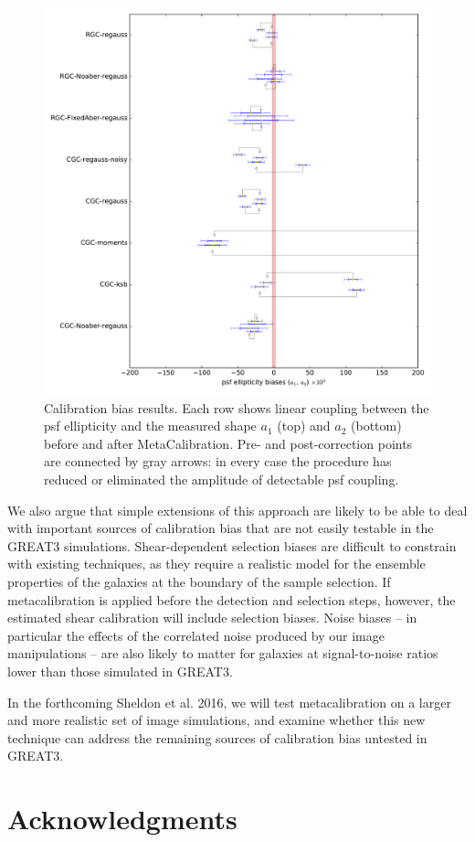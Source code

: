 \documentclass[iop]{emulateapj}
\begin{document}
\begin{figure}[t]
\begin{center}
\includegraphics[width=0.8\linewidth]{./Plots/a_results_linear.pdf}
\end{center}
\caption{Calibration bias results. Each row shows linear coupling
  between the psf ellipticity and the measured shape $a_1$ (top) and
  $a_2$ (bottom) before and after MetaCalibration. Pre- and
  post-correction points are connected by gray arrows: in every case
  the procedure has reduced or eliminated the amplitude of detectable
  psf coupling.}
\end{figure}



We also argue that simple extensions of this approach are likely to be
able to deal with important sources of calibration bias that are not
easily testable in the GREAT3 simulations. Shear-dependent selection
biases are difficult to constrain with existing techniques, as they
require a realistic model for the ensemble properties of the galaxies
at the boundary of the sample selection. If metacalibration is applied
before the detection and selection steps, however, the estimated shear
calibration will include selection biases. Noise biases -- in
particular the effects of the correlated noise produced by our image
manipulations -- are also likely to matter for galaxies at
signal-to-noise ratios lower than those simulated in GREAT3.

In the forthcoming Sheldon et al. 2016, we will test metacalibration
on a larger and more realistic set of image simulations, and examine
whether this new technique can address the remaining sources of
calibration bias untested in GREAT3.




\section*{Acknowledgments}




\end{document}
